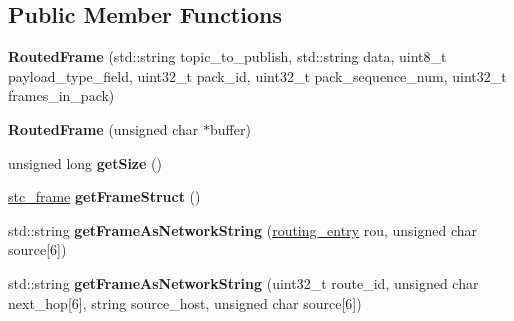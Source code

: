 \subsection*{Public Member Functions}
\begin{DoxyCompactItemize}
\item 
\hypertarget{classRoutedFrame_acce70d6e6faba3c7552a0047310134a7}{{\bfseries Routed\-Frame} (std\-::string topic\-\_\-to\-\_\-publish, std\-::string data, uint8\-\_\-t payload\-\_\-type\-\_\-field, uint32\-\_\-t pack\-\_\-id, uint32\-\_\-t pack\-\_\-sequence\-\_\-num, uint32\-\_\-t frames\-\_\-in\-\_\-pack)}\label{classRoutedFrame_acce70d6e6faba3c7552a0047310134a7}

\item 
\hypertarget{classRoutedFrame_ab19fd22358ff2285bdb1ed30b6f82046}{{\bfseries Routed\-Frame} (unsigned char $\ast$buffer)}\label{classRoutedFrame_ab19fd22358ff2285bdb1ed30b6f82046}

\item 
\hypertarget{classRoutedFrame_a28ff8e7e3ef99fe147cacaa6344ec022}{unsigned long {\bfseries get\-Size} ()}\label{classRoutedFrame_a28ff8e7e3ef99fe147cacaa6344ec022}

\item 
\hypertarget{classRoutedFrame_aac21d89fb44e75b0b875919ae45a24af}{\hyperlink{structstc__frame}{stc\-\_\-frame} {\bfseries get\-Frame\-Struct} ()}\label{classRoutedFrame_aac21d89fb44e75b0b875919ae45a24af}

\item 
\hypertarget{classRoutedFrame_a2d6d1b1017c34be2064151646bd07ce8}{std\-::string {\bfseries get\-Frame\-As\-Network\-String} (\hyperlink{structrouting__entry}{routing\-\_\-entry} rou, unsigned char source\mbox{[}6\mbox{]})}\label{classRoutedFrame_a2d6d1b1017c34be2064151646bd07ce8}

\item 
\hypertarget{classRoutedFrame_a37a8fa4df09a1d3768278b10d0734a5a}{std\-::string {\bfseries get\-Frame\-As\-Network\-String} (uint32\-\_\-t route\-\_\-id, unsigned char next\-\_\-hop\mbox{[}6\mbox{]}, string source\-\_\-host, unsigned char source\mbox{[}6\mbox{]})}\label{classRoutedFrame_a37a8fa4df09a1d3768278b10d0734a5a}

\end{DoxyCompactItemize}
